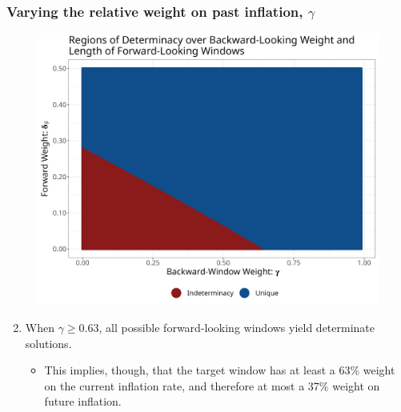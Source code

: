 \documentclass{beamer}
\begin{document}
\begin{frame}
	\frametitle{Varying the relative weight on past inflation, $\gamma$}	
	\begin{center}		
		\begin{figure}%
			\includegraphics[width=\textwidth,height=0.5\textheight,keepaspectratio]{../code/gamma_deltaF.png}
		\end{figure}%
	\end{center}%
	\begin{enumerate}
		\setcounter{enumi}{1}
		\setlength{\itemsep}{1em}
		\item When $\gamma \geq 0.63$, all possible forward-looking windows yield determinate solutions. 
		\begin{itemize}
			\item This implies, though, that the target window has at least a 63\% weight on the current inflation rate, and therefore at most a 37\% weight on future inflation.
		\end{itemize}
	\end{enumerate}
\end{frame}
\end{document}

